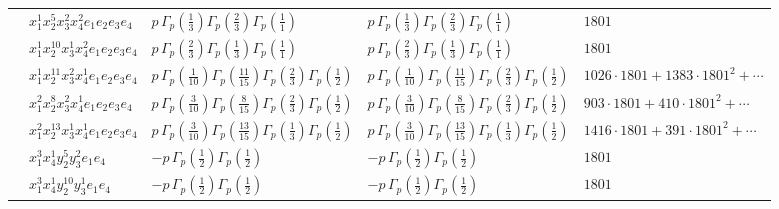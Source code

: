\documentclass[11pt]{article}
\begin{document}
\begin{table}[ht]
{\begin{tabular}{@{}lllll@{}}
 & $x_{1}^{1} x_{2}^{5} x_{3}^{2} x_{4}^{2}  e_{1} e_{2} e_{3} e_{4}$ & $p \, \Gamma_p \left( \frac{1}{3} \right) \Gamma_p \left( \frac{2}{3} \right) \Gamma_p \left( \frac{1}{1} \right)$ & $p \, \Gamma_p \left( \frac{1}{3} \right) \Gamma_p \left( \frac{2}{3} \right) \Gamma_p \left( \frac{1}{1} \right)$ & $1801$ \\
 & $x_{1}^{1} x_{2}^{10} x_{3}^{1} x_{4}^{2}  e_{1} e_{2} e_{3} e_{4}$ & $p \, \Gamma_p \left( \frac{2}{3} \right) \Gamma_p \left( \frac{1}{3} \right) \Gamma_p \left( \frac{1}{1} \right)$ & $p \, \Gamma_p \left( \frac{2}{3} \right) \Gamma_p \left( \frac{1}{3} \right) \Gamma_p \left( \frac{1}{1} \right)$ & $1801$ \\
 & $x_{1}^{1} x_{2}^{11} x_{3}^{2} x_{4}^{1}  e_{1} e_{2} e_{3} e_{4}$ & $p \, \Gamma_p \left( \frac{1}{10} \right) \Gamma_p \left( \frac{11}{15} \right) \Gamma_p \left( \frac{2}{3} \right) \Gamma_p \left( \frac{1}{2} \right)$ & $p \, \Gamma_p \left( \frac{1}{10} \right) \Gamma_p \left( \frac{11}{15} \right) \Gamma_p \left( \frac{2}{3} \right) \Gamma_p \left( \frac{1}{2} \right)$ & $1026{\cdot}1801{+}1383{\cdot}1801^{2}{+}\cdots$ \\
 & $x_{1}^{2} x_{2}^{8} x_{3}^{2} x_{4}^{1}  e_{1} e_{2} e_{3} e_{4}$ & $p \, \Gamma_p \left( \frac{3}{10} \right) \Gamma_p \left( \frac{8}{15} \right) \Gamma_p \left( \frac{2}{3} \right) \Gamma_p \left( \frac{1}{2} \right)$ & $p \, \Gamma_p \left( \frac{3}{10} \right) \Gamma_p \left( \frac{8}{15} \right) \Gamma_p \left( \frac{2}{3} \right) \Gamma_p \left( \frac{1}{2} \right)$ & $903{\cdot}1801{+}410{\cdot}1801^{2}{+}\cdots$ \\
 & $x_{1}^{2} x_{2}^{13} x_{3}^{1} x_{4}^{1}  e_{1} e_{2} e_{3} e_{4}$ & $p \, \Gamma_p \left( \frac{3}{10} \right) \Gamma_p \left( \frac{13}{15} \right) \Gamma_p \left( \frac{1}{3} \right) \Gamma_p \left( \frac{1}{2} \right)$ & $p \, \Gamma_p \left( \frac{3}{10} \right) \Gamma_p \left( \frac{13}{15} \right) \Gamma_p \left( \frac{1}{3} \right) \Gamma_p \left( \frac{1}{2} \right)$ & $1416{\cdot}1801{+}391{\cdot}1801^{2}{+}\cdots$ \\
 & $x_{1}^{3} x_{4}^{1} y_{2}^{5} y_{3}^{2} e_{1} e_{4}$ & $- p \, \Gamma_p \left( \frac{1}{2} \right) \Gamma_p \left( \frac{1}{2} \right)$ & $- p \, \Gamma_p \left( \frac{1}{2} \right) \Gamma_p \left( \frac{1}{2} \right)$ & $1801$ \\
 & $x_{1}^{3} x_{4}^{1} y_{2}^{10} y_{3}^{1} e_{1} e_{4}$ & $- p \, \Gamma_p \left( \frac{1}{2} \right) \Gamma_p \left( \frac{1}{2} \right)$ & $- p \, \Gamma_p \left( \frac{1}{2} \right) \Gamma_p \left( \frac{1}{2} \right)$ & $1801$ \\

\end{tabular}}
\end{table}
\end{document}
